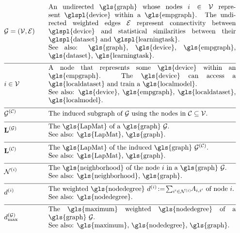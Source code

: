 \begin{align}
 	&\graph = \pair{\nodes}{\edges} & \quad & \parbox{.80\textwidth}{An undirected \gls{graph} whose nodes $\nodeidx \in \nodes$ represent 
		\glspl{device} within a \gls{empgraph}. The undirected weighted edges $\edges$ represent connectivity between 
		\glspl{device} and statistical similarities between their \glspl{dataset} and \glspl{learningtask}.
		\\ See also: \gls{graph}, \gls{device}, \gls{empgraph}, \gls{dataset}, \gls{learningtask}. }\nonumber \\[2mm] \hline \nonumber\\[-5mm]
	&\nodeidx \in \nodes& \quad & \parbox{.80\textwidth}{A node that represents some 
		\gls{device} within an \gls{empgraph}. The \gls{device} can access a \gls{localdataset} and train a \gls{localmodel}.
		\\ See also: \gls{device}, \gls{empgraph}, \gls{localdataset}, \gls{localmodel}. }\nonumber \\[2mm] \hline \nonumber\\[-5mm]
	&\indsubgraph{\graph}{\cluster}& \quad & \parbox{.80\textwidth}{The induced subgraph of $\graph$ using the nodes in $\cluster \subseteq \nodes$. } \nonumber \\[2mm] \hline \nonumber\\[-5mm]
	&\LapMat{\graph}   & \quad & \parbox{.80\textwidth}{The \gls{LapMat} of a \gls{graph} $\graph$.
		\\ See also: \gls{LapMat}, \gls{graph}. }\nonumber \\[2mm] \hline \nonumber\\[-5mm]
	&\LapMat{\cluster}   & \quad & \parbox{.80\textwidth}{The \gls{LapMat} of the induced \gls{graph} $\indsubgraph{\graph}{\cluster}$.
		\\ See also: \gls{LapMat}, \gls{graph}. } \nonumber \\[2mm] \hline \nonumber\\[-5mm]
	 &\neighbourhood{\nodeidx}  & \quad & \parbox{.80\textwidth}{The \gls{neighborhood} of the node $\nodeidx$ in a \gls{graph} $\graph$.
	 	\\ See also: \gls{neighborhood}, \gls{graph}. }   \nonumber \\[2mm] \hline \nonumber\\[-5mm]
	&\nodedegree{\nodeidx} & \quad & \parbox{.80\textwidth}{The weighted \gls{nodedegree} 
		$\nodedegree{\nodeidx}\!\defeq\!\sum_{\nodeidx' \in \neighbourhood{\nodeidx}}\hspace*{-1mm} \edgeweight_{\nodeidx,\nodeidx'}$ of node $\nodeidx$. 
		\\ See also: \gls{nodedegree}. }  \nonumber \\[2mm] \hline \nonumber\\[-5mm]
	&\maxnodedegree^{(\graph)} & \quad & \parbox{.80\textwidth}{The \gls{maximum} weighted \gls{nodedegree} of a \gls{graph} $\graph$.
		\\ See also: \gls{maximum}, \gls{nodedegree}, \gls{graph}. } \nonumber 
\end{align} 

